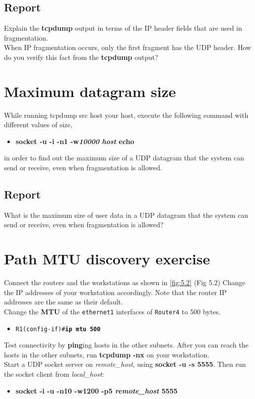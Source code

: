 \documentclass[10pt,a4paper]{article}
\numberwithin{equation}{section}
\numberwithin{figure}{section}
\numberwithin{table}{section}
\begin{document}
	\subsection*{Report}
	Explain the \textbf{tcpdump} output in terms of the IP header fields that are used in fragmentation. \\
	When IP fragmentation occurs, only the first fragment has the UDP header.
	How do you verify this fact from the \textbf{tcpdump} output?


\section{Maximum datagram size}
\label{sec:MaxDatagramSize}
	While running tcpdump src host your host, execute the following command with different values of size,
	\begin{itemize}
		\item \textbf{socket -u -i -n1 -w\textit{10000} \textit{host} echo}
	\end{itemize}
	in order to find out the maximum size of a UDP datagram that the system can send or receive, even when fragmentation is allowed.

\subsection*{Report}
	What is the maximum size of user data in a UDP datagram that the system can send or receive, even when fragmentation is allowed?


\section*{Path MTU discovery exercise}
	Connect the routers and the workstations as shown in \autoref{fig:5.2} (Fig 5.2) Change the IP
	addresses of your workstation accordingly. Note that the router IP addresses are
	the same as their default.\\
	Change the \textbf{MTU} of the \texttt{ethernet1} interfaces of \texttt{Router4} to 500
	bytes.
	\begin{itemize}
		\item \texttt{R1(config-if)\#\textbf{ip mtu 500}}
	\end{itemize}
	Test connectivity by \textbf{ping}ing hosts in the other subnets. After you can reach the
	hosts in the other subnets, run \textbf{tcpdump -nx} on your workstation.\\
	Start a UDP socket server on \textit{remote\_host}, using \textbf{socket -u -s 5555}.
	Then run the socket client from \textit{local\_host}:
	\begin{itemize}
		\item \textbf{socket -i -u -n10 -w1200 -p5 \textit{remote\_host} 5555}
	\end{itemize}
\end{document}
